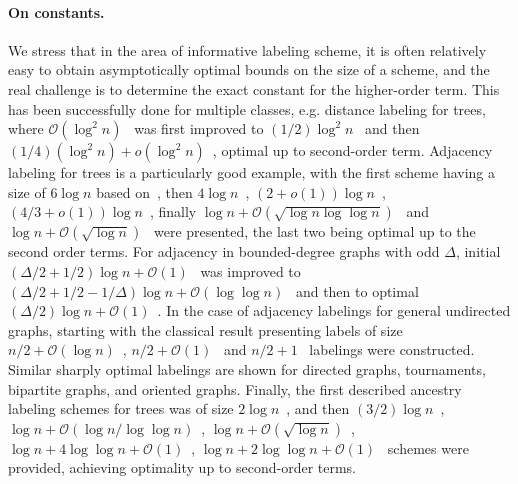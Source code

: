 \documentclass[a4paper,11pt]{article}
\newcommand{\Oh}{\mathcal{O}}
\begin{document}
\paragraph{On constants.}
We stress that in the area of informative labeling scheme, it is often relatively easy to obtain asymptotically optimal
bounds on the size of a scheme, and the real challenge is to determine the exact constant for the higher-order term.
This has been successfully done for multiple classes, e.g. distance labeling for trees, where $\Oh(\log^2{n})$~\cite{PelegTD} was
first improved to  $(1/2)\log^2{n}$~\cite{alstrup2015distance} and then $(1/4)(\log^2{n})+o(\log^2{n})$~\cite{FGNW16},
optimal up to second-order term.
Adjacency labeling for trees is a particularly good example, with the first scheme having a size of $6\log{n}$
based on~\cite{Muller}, then $4\log{n}$~\cite{Kannan}, $(2+o(1))\log{n}$~\cite{GavoilleL07},
$(4/3+o(1))\log{n}$~\cite{Planar1}, finally $\log{n}+\Oh(\sqrt{\log{n}\log{\log{n}}})$~\cite{PlanarMain}
and $\log{n}+\Oh(\sqrt{\log{n}})$~\cite{GawrychowskiJ22} were presented, the last two being optimal up to the second order terms.
For adjacency in bounded-degree graphs with odd $\Delta$, initial $(\Delta/2+1/2)\log{n}+\Oh(1)$~\cite{Butler2009} was improved
to $(\Delta/2+1/2-1/\Delta)\log{n}+\Oh(\log{\log{n}})$~\cite{EsperetLO08} and then to optimal $(\Delta/2)\log{n}+\Oh(1)$~\cite{AlonN17}.
In the case of adjacency labelings for general undirected graphs, starting with the classical result presenting labels of size
$n/2+\Oh(\log{n})$~\cite{moon_1965}, $n/2+\Oh(1)$~\cite{alstrup2015adjacency} and $n/2+1$~\cite{Alon17}
labelings were constructed.
Similar sharply optimal labelings are shown for directed graphs, tournaments, bipartite graphs, and oriented graphs.
Finally, the first described ancestry labeling schemes for trees was of size $2\log{n}$~\cite{Kannan}, and then
$(3/2)\log{n}$~\cite{AbiteboulKM01}, $\log{n}+\Oh(\log{n}/\log{\log{n}})$~\cite{thorup2001compact}, $\log{n}+\Oh(\sqrt{\log{n}})$~\cite{AbiteboulAKMR06}, $\log{n}+4\log{\log{n}}+\Oh(1)$~\cite{FraigniaudAncestry}, $\log{n}+2\log{\log{n}}+\Oh(1)$~\cite{DahlgaardKR15} schemes were provided, achieving optimality up to second-order terms.
\end{document}
